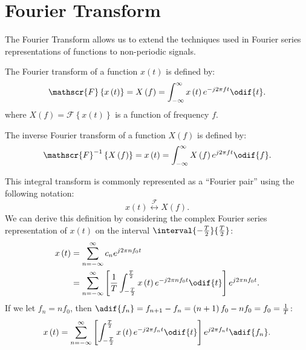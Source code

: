 \documentclass{article}
\begin{document}
\section{Fourier Transform}
The Fourier Transform allows us to extend the techniques used in Fourier series representations of functions
to non-periodic signals.
\begin{definition}
    The Fourier transform of a function \(x\left( t \right)\) is defined by:
    \begin{equation*}
        \mathscr{F}\left\{ x\left( t \right) \right\} = X\left( f \right) = \int_{-\infty}^\infty x\left( t \right) e^{-j 2\pi f t} \odif{t}.
    \end{equation*}
    where \(X\left( f \right) = \mathscr{F}\left\{ x\left( t \right) \right\}\) is a function of frequency \(f\).
\end{definition}
\begin{definition}
    The inverse Fourier transform of a function \(X\left( f \right)\) is defined by:
    \begin{equation*}
        \mathscr{F}^{-1}\left\{ X\left( f \right) \right\} = x\left( t \right) = \int_{-\infty}^\infty X\left( f \right) e^{j 2\pi f t} \odif{f}.
    \end{equation*}
\end{definition}
This integral transform is commonly represented as a ``Fourier pair'' using the following notation:
\begin{equation*}
    x\left( t \right) \overset{\mathscr{F}}{\longleftrightarrow} X\left( f \right).
\end{equation*}
We can derive this definition by considering the complex Fourier series representation of \(x\left( t \right)\)
on the interval \(\interval{-\frac{T}{2}}{\frac{T}{2}}\):
\begin{align*}
    x\left( t \right) & = \sum_{n = -\infty}^\infty c_n e^{j 2\pi n f_0 t}                                                                                                          \\
                      & = \sum_{n = -\infty}^\infty \left[ \frac{1}{T} \int_{-\frac{T}{2}}^{\frac{T}{2}} x\left( t \right) e^{-j 2\pi n f_0 t} \odif{t} \right] e^{j 2\pi n f_0 t}.
\end{align*}
If we let \(f_n = n f_0\), then \(\adif{f_n} = f_{n + 1} - f_n = \left( n + 1 \right)f_0 - n f_0 = f_0 = \frac{1}{T}\):
\begin{equation*}
    x\left( t \right) = \sum_{n = -\infty}^\infty \left[ \int_{-\frac{T}{2}}^{\frac{T}{2}} x\left( t \right) e^{-j 2\pi f_n t} \odif{t} \right] e^{j 2\pi f_n t} \adif{f_n}.
\end{equation*}
\end{document}
